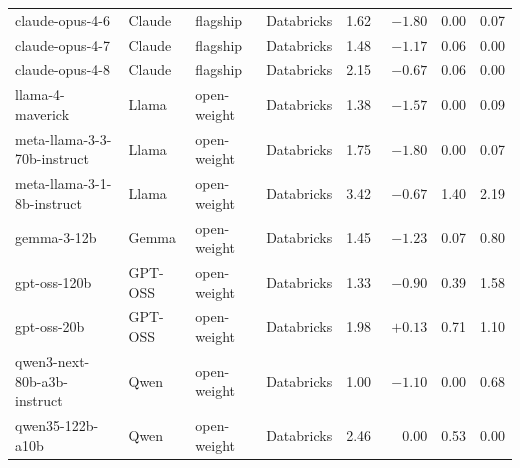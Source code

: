 \documentclass{article}
\begin{document}
\begin{table}[h]
\begin{tabular}{llllrrrr}
    claude-opus-4-6             & Claude  & flagship    & Databricks & 1.62 & $-1.80$ & 0.00 & 0.07 \\
    claude-opus-4-7             & Claude  & flagship    & Databricks & 1.48 & $-1.17$ & 0.06 & 0.00 \\
    claude-opus-4-8             & Claude  & flagship    & Databricks & 2.15 & $-0.67$ & 0.06 & 0.00 \\
    llama-4-maverick            & Llama   & open-weight & Databricks & 1.38 & $-1.57$ & 0.00 & 0.09 \\
    meta-llama-3-3-70b-instruct & Llama   & open-weight & Databricks & 1.75 & $-1.80$ & 0.00 & 0.07 \\
    meta-llama-3-1-8b-instruct  & Llama   & open-weight & Databricks & 3.42 & $-0.67$ & 1.40 & 2.19 \\
    gemma-3-12b                 & Gemma   & open-weight & Databricks & 1.45 & $-1.23$ & 0.07 & 0.80 \\
    gpt-oss-120b                & GPT-OSS & open-weight & Databricks & 1.33 & $-0.90$ & 0.39 & 1.58 \\
    gpt-oss-20b                 & GPT-OSS & open-weight & Databricks & 1.98 & $+0.13$ & 0.71 & 1.10 \\
    qwen3-next-80b-a3b-instruct & Qwen    & open-weight & Databricks & 1.00 & $-1.10$ & 0.00 & 0.68 \\
    qwen35-122b-a10b            & Qwen    & open-weight & Databricks & 2.46 & $\phantom{-}0.00$ & 0.53 & 0.00 \\
    \bottomrule
  \end{tabular}
\end{table}
\end{document}
